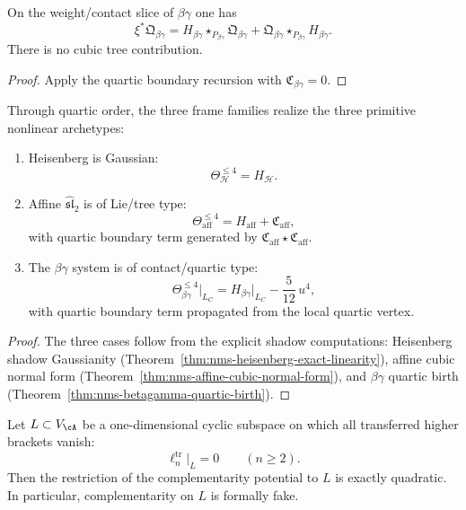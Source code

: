 \begin{corollary}
\label{cor:nms-betagamma-boundary-law}
On the weight/contact slice of $\beta\gamma$ one has
\[
\xi^*\mathfrak Q_{\beta\gamma}
=
H_{\beta\gamma}\star_{P_{\beta\gamma}}\mathfrak Q_{\beta\gamma}
+
\mathfrak Q_{\beta\gamma}\star_{P_{\beta\gamma}}H_{\beta\gamma}.
\]
There is no cubic tree contribution.
\end{corollary}

\begin{proof}
Apply the quartic boundary recursion with $\mathfrak C_{\beta\gamma}=0$.\qedhere
\end{proof}

\begin{theorem}
\label{thm:nms-archetype-trichotomy}
Through quartic order, the three frame families realize the three primitive nonlinear archetypes:
\begin{enumerate}[label=\textup{(\roman*)}]
\item Heisenberg is Gaussian:
\[
\Theta_{\mathcal H}^{\le 4}=H_{\mathcal H}.
\]
\item Affine $\widehat{\mathfrak{sl}}_2$ is of Lie/tree type:
\[
\Theta_{\mathrm{aff}}^{\le 4}=H_{\mathrm{aff}}+\mathfrak C_{\mathrm{aff}},
\]
with quartic boundary term generated by $\mathfrak C_{\mathrm{aff}}\star \mathfrak C_{\mathrm{aff}}$.
\item The $\beta\gamma$ system is of contact/quartic type:
\[
\Theta_{\beta\gamma}^{\le 4}\big|_{L_C}
=H_{\beta\gamma}\big|_{L_C}-\frac{5}{12}\,u^4,
\]
with quartic boundary term propagated from the local quartic vertex.
\end{enumerate}
\end{theorem}

\begin{proof}
The three cases follow from the explicit shadow computations:
Heisenberg shadow Gaussianity (Theorem~\ref{thm:nms-heisenberg-exact-linearity}),
affine cubic normal form (Theorem~\ref{thm:nms-affine-cubic-normal-form}),
and $\beta\gamma$ quartic birth (Theorem~\ref{thm:nms-betagamma-quartic-birth}).
\end{proof}

\begin{theorem}
\label{thm:nms-rank-one-rigidity}
Let $L \subset V_{\cA}$ be a one-dimensional cyclic subspace on which all transferred higher brackets vanish:
\[
\ell_n^{\mathrm{tr}}\big|_L = 0 \qquad (n \ge 2).
\]
Then the restriction of the complementarity potential to $L$ is exactly quadratic. In particular, complementarity on $L$ is formally fake.
\end{theorem}

